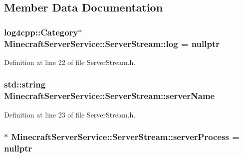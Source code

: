 \subsection{Member Data Documentation}
\subsubsection[{\texorpdfstring{log}{log}}]{\setlength{\rightskip}{0pt plus 5cm}log4cpp\+::\+Category$\ast$ Minecraft\+Server\+Service\+::\+Server\+Stream\+::log = nullptr\hspace{0.3cm}{\ttfamily [protected]}}\hypertarget{class_minecraft_server_service_1_1_server_stream_a698b7dfef7f76adc005d81eb6a11dd28}{}\label{class_minecraft_server_service_1_1_server_stream_a698b7dfef7f76adc005d81eb6a11dd28}


Definition at line 22 of file Server\+Stream.\+h.

\subsubsection[{\texorpdfstring{server\+Name}{serverName}}]{\setlength{\rightskip}{0pt plus 5cm}std\+::string Minecraft\+Server\+Service\+::\+Server\+Stream\+::server\+Name\hspace{0.3cm}{\ttfamily [protected]}}\hypertarget{class_minecraft_server_service_1_1_server_stream_aa6aeeef202bcbaf6b6668a03f7682efb}{}\label{class_minecraft_server_service_1_1_server_stream_aa6aeeef202bcbaf6b6668a03f7682efb}


Definition at line 23 of file Server\+Stream.\+h.

\subsubsection[{\texorpdfstring{server\+Process}{serverProcess}}]{$\ast$ Minecraft\+Server\+Service\+::\+Server\+Stream\+::server\+Process = nullptr\hspace{0.3cm}{\ttfamily [protected]}}\hypertarget{class_minecraft_server_service_1_1_server_stream_a974b8007a5c437d221f482543044acb4}{}\label{class_minecraft_server_service_1_1_server_stream_a974b8007a5c437d221f482543044acb4}


